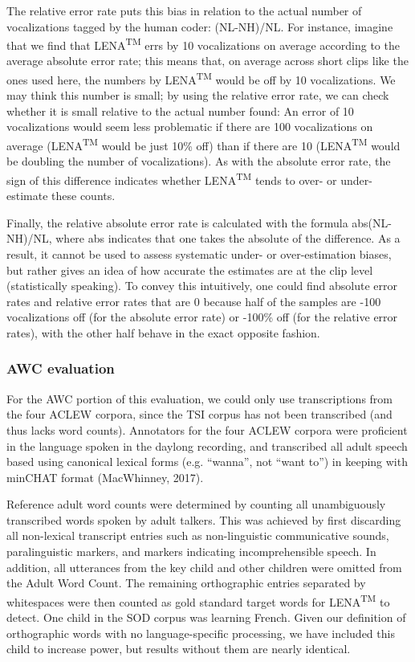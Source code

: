 \documentclass[english,floatsintext,man]{apa6}
\begin{document}
The relative error rate puts this bias in relation to the actual number
of vocalizations tagged by the human coder: (NL-NH)/NL. For instance,
imagine that we find that LENA\textsuperscript{TM} errs by 10
vocalizations on average according to the average absolute error rate;
this means that, on average across short clips like the ones used here,
the numbers by LENA\textsuperscript{TM} would be off by 10
vocalizations. We may think this number is small; by using the relative
error rate, we can check whether it is small relative to the actual
number found: An error of 10 vocalizations would seem less problematic
if there are 100 vocalizations on average (LENA\textsuperscript{TM}
would be just 10\% off) than if there are 10 (LENA\textsuperscript{TM}
would be doubling the number of vocalizations). As with the absolute
error rate, the sign of this difference indicates whether
LENA\textsuperscript{TM} tends to over- or under-estimate these counts.

Finally, the relative absolute error rate is calculated with the formula
abs(NL-NH)/NL, where abs indicates that one takes the absolute of the
difference. As a result, it cannot be used to assess systematic under-
or over-estimation biases, but rather gives an idea of how accurate the
estimates are at the clip level (statistically speaking). To convey this
intuitively, one could find absolute error rates and relative error
rates that are 0 because half of the samples are -100 vocalizations off
(for the absolute error rate) or -100\% off (for the relative error
rates), with the other half behave in the exact opposite fashion.

\subsubsection{AWC evaluation}\label{awc-evaluation}

For the AWC portion of this evaluation, we could only use transcriptions
from the four ACLEW corpora, since the TSI corpus has not been
transcribed (and thus lacks word counts). Annotators for the four ACLEW
corpora were proficient in the language spoken in the daylong recording,
and transcribed all adult speech based using canonical lexical forms
(e.g. \enquote{wanna}, not \enquote{want to}) in keeping with minCHAT
format (MacWhinney, 2017).

Reference adult word counts were determined by counting all
unambiguously transcribed words spoken by adult talkers. This was
achieved by first discarding all non-lexical transcript entries such as
non-linguistic communicative sounds, paralinguistic markers, and markers
indicating incomprehensible speech. In addition, all utterances from the
key child and other children were omitted from the Adult Word Count. The
remaining orthographic entries separated by whitespaces were then
counted as gold standard target words for LENA\textsuperscript{TM} to
detect. One child in the SOD corpus was learning French. Given our
definition of orthographic words with no language-specific processing,
we have included this child to increase power, but results without them
are nearly identical.
\end{document}
